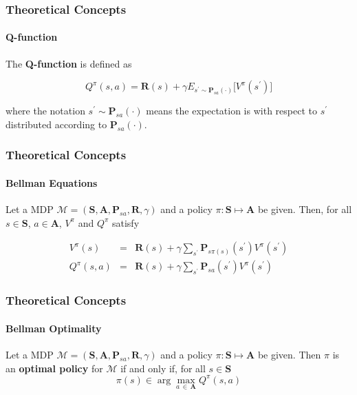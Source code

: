 \begin{frame}
	\frametitle{Theoretical Concepts}
	\framesubtitle{Q-function}
	
	\Large
	
	The \textbf{Q-function} is defined as
	
	\begin{equation*}
		Q^\pi(s,a) = \mathbf{R}(s) + \gamma E_{s^\prime \sim \mathbf{P}_{sa}(\cdot)} \big [
		V^\pi(s^\prime) \big ]
	\end{equation*}
	
	\vspace{0.5cm}
	
	where the notation $ s^\prime \sim \mathbf{P}_{sa}(\cdot) $ means the expectation is with
	respect to $ s^\prime $ distributed according to $ \mathbf{P}_{sa}(\cdot) $.\\
\end{frame}

\begin{frame}
	\frametitle{Theoretical Concepts}
	\framesubtitle{Bellman Equations}
	
	\Large
	
	\vspace{0.3cm}
	
	Let a MDP $ \mathcal{M} = (\mathbf{S},\mathbf{A},\mathbf{P}_{sa},\mathbf{R},\gamma) $ and a
	policy $ \pi : \mathbf{S} \mapsto \mathbf{A} $ be given. Then, for all $ s \in \mathbf{S} $,
	$ a \in \mathbf{A} $, $ V^\pi $ and $ Q^\pi $ satisfy
	
	\vspace{-0.2cm}
	
	\begin{eqnarray*}
		V^\pi(s) &=& \mathbf{R}(s) + \gamma \sum_{s^\prime} \mathbf{P}_{s\pi(s)}(s^\prime)V^\pi(s^\prime)\\
		Q^\pi(s,a) &=& \mathbf{R}(s) + \gamma \sum_{s^\prime} \mathbf{P}_{sa}(s^\prime)V^\pi(s^\prime)
	\end{eqnarray*}
\end{frame}

\begin{frame}
	\frametitle{Theoretical Concepts}
	\framesubtitle{Bellman Optimality}
	
	\Large
	
	Let a MDP $ \mathcal{M} = (\mathbf{S},\mathbf{A},\mathbf{P}_{sa},\mathbf{R},\gamma) $ and a
	policy $ \pi : \mathbf{S} \mapsto \mathbf{A} $ be given. Then $ \pi $ is an \textbf{optimal
	policy} for $ \mathcal{M} $ if and only if, for all $ s \in \mathbf{S} $\\
	
	\begin{equation*}
		\pi(s) \in \arg \max_{a \, \in \, \mathbf{A}} Q^\pi(s,a)
	\end{equation*}
\end{frame}

